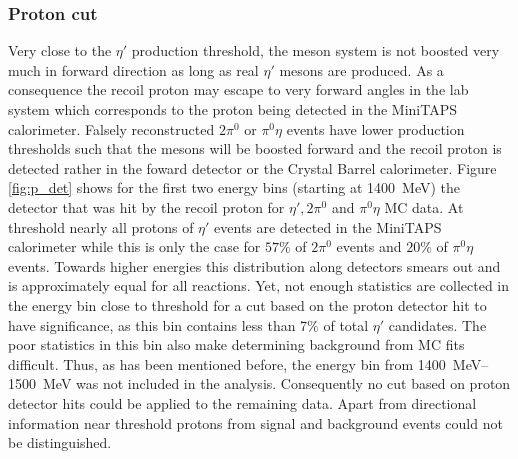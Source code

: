 \subsubsection{Proton cut}
Very close to the $\eta'$ production threshold, the meson system is not boosted very much in forward direction as long as real $\eta'$ mesons are produced. As a consequence the recoil proton may escape to very forward angles in the lab system which corresponds to the proton being detected in the MiniTAPS calorimeter. Falsely reconstructed $2\pi^0$ or $\pi^0\eta$ events have lower production thresholds such that the mesons will be boosted forward and the recoil proton is detected rather in the foward detector or the Crystal Barrel calorimeter. Figure \ref{fig:p_det} shows for the first two energy bins (starting at \SI{1400}{\mega\eV}) the detector that was hit by the recoil proton for $\eta', 2\pi^0$ and $\pi^0\eta$ MC data. At threshold nearly all protons of $\eta'$ events are detected in the MiniTAPS calorimeter while this is only the case for $57\%$ of $2\pi^0$ events and $20\%$ of $\pi^0\eta$ events. Towards higher energies this distribution along detectors smears out and is approximately equal for all reactions. Yet, not enough statistics  are collected in the energy bin close to threshold for a cut based on the proton detector hit to have significance, as this bin contains less than 7\% of total $\eta'$ candidates. The poor statistics in this bin also make determining background from MC fits difficult. Thus, as has been mentioned before, the energy bin from \SIrange{1400}{1500}{\mega\eV} was not included in the analysis. Consequently no cut based on proton detector hits could be applied to the remaining data. Apart from directional information near threshold protons from signal and background events could not be distinguished.
